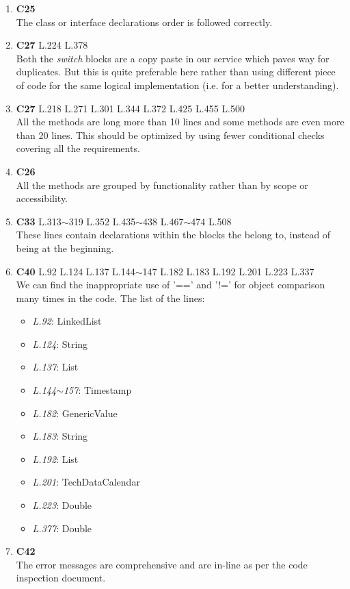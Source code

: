 \begin{enumerate}
	\item \textbf{C25} \\ The class or interface declarations order is followed correctly.
	\item \textbf{C27} L.224 L.378 \\ Both the \textit{switch} blocks are a copy paste in our service which paves way for duplicates. But this is quite preferable here rather than using different piece of code for the same logical implementation (i.e. for a better understanding).
	\item \textbf{C27} L.218 L.271 L.301 L.344 L.372 L.425 L.455 L.500 \\ All the methods are long more than 10 lines and some methods are even more than 20 lines. This should be optimized by using fewer conditional checks covering all the requirements.
	\item \textbf{C26} \\ All the methods are grouped by functionality rather than by scope or accessibility.
	\item \textbf{C33} L.313$\sim$319 L.352 L.435$\sim$438 L.467$\sim$474 L.508 \\ These lines contain declarations within the blocks the belong to, instead of being at the beginning.
	\item \textbf{C40} L.92 L.124 L.137 L.144$\sim$147 L.182 L.183 L.192 L.201 L.223 L.337 \\ We can find the inappropriate use of '==' and '!=' for object comparison many times in the code. The list of the lines:
	\begin{itemize}
	\vspace*{-0.25cm}
		\item \emph{L.92}: LinkedList
		\item \emph{L.124}: String
		\item \emph{L.137}: List
		\item \emph{L.144$\sim$157}: Timestamp
		\item \emph{L.182}: GenericValue
		\item \emph{L.183}: String
		\item \emph{L.192}: List
		\item \emph{L.201}: TechDataCalendar
		\item \emph{L.223}: Double
		\item \emph{L.377}: Double
	\vspace*{-0.05cm}
	\end{itemize}
	\item \textbf{C42} \\ The error messages are comprehensive and are in-line as per the code inspection document.

\end{enumerate}
